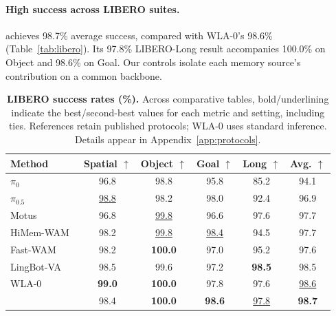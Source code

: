 \paragraph{High success across LIBERO suites.}
\method{} achieves 98.7\% average success, compared with WLA-0's 98.6\% (Table~\ref{tab:libero}).
Its 97.8\% LIBERO-Long result accompanies 100.0\% on Object and 98.6\% on Goal. Our controls isolate each memory source's contribution on a common backbone.
\begin{table}[htbp]
\vspace{-0.3cm}
\centering
\small
\setlength{\tabcolsep}{9.0pt}
\caption{\textbf{LIBERO success rates (\%).} Across comparative tables, bold/underlining indicate the best/second-best values for each metric and setting, including ties. References retain published protocols; WLA-0 uses standard inference. Details appear in Appendix~\ref{app:protocols}.}
\label{tab:libero}
\label{tab:main}
\begin{tabular}{@{}lccccc@{}}
\toprule
Method & Spatial $\uparrow$ & Object $\uparrow$ & Goal $\uparrow$ & Long $\uparrow$ & Avg. $\uparrow$ \\
\midrule
$\pi_0$~\citep{black2025pi0} & 96.8 & 98.8 & 95.8 & 85.2 & 94.1 \\
$\pi_{0.5}$~\citep{intelligence2025pi05} & \underline{98.8} & 98.2 & 98.0 & 92.4 & 96.9 \\
Motus~\citep{bi2025motus} & 96.8 & \underline{99.8} & 96.6 & 97.6 & 97.7 \\
HiMem-WAM~\citep{sun2026himem} & 98.2 & \underline{99.8} & \underline{98.4} & 94.5 & 97.7 \\
Fast-WAM~\citep{yuan2026fastwam} & 98.2 & \textbf{100.0} & 97.0 & 95.2 & 97.6 \\
LingBot-VA~\citep{li2026lingbotva} & 98.5 & 99.6 & 97.2 & \textbf{98.5} & 98.5 \\
WLA-0~\citep{yang2026wla} & \textbf{99.0} & \textbf{100.0} & 97.8 & 97.6 & \underline{98.6} \\
\midrule
\rowcolor{blue!7}
\method{} & 98.4 & \textbf{100.0} & \textbf{98.6} & \underline{97.8} & \textbf{98.7} \\
\bottomrule
\end{tabular}
\end{table}
